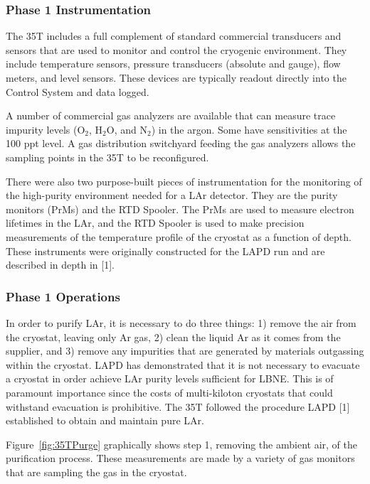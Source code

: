 \subsubsection {Phase 1 Instrumentation}

The 35T includes a full complement of standard commercial transducers and sensors that are used to 
monitor and control the cryogenic environment. They include temperature sensors, pressure transducers 
(absolute and gauge), flow meters, and level sensors. These devices are typically readout directly into the 
Control System and data logged. 

A number of commercial gas analyzers are available that can measure trace impurity levels (O$_2$, H$_2$O, and 
N$_2$) in the argon. Some have sensitivities at the 100 ppt level. A gas distribution switchyard feeding the 
gas analyzers allows the sampling points in the 35T to be reconfigured.

There were also two purpose-built pieces of instrumentation for the monitoring of the high-purity 
environment needed for a LAr detector. They are the purity monitors (PrMs) and the RTD Spooler. The 
PrMs are used to measure electron lifetimes in the LAr, and the RTD Spooler is used to make precision 
measurements of the temperature profile of the cryostat as a function of depth.  These instruments were 
originally constructed for the LAPD run and are described in depth in [1]\fixme{}.

\subsubsection {Phase 1 Operations}

In order to purify LAr, it is necessary to do three things: 1) remove the air from the cryostat, leaving only Ar gas, 2) clean the liquid Ar as it comes from the supplier, and 3) remove any impurities that are generated by materials outgassing within the cryostat.  
LAPD has demonstrated that it is not necessary to evacuate a cryostat in order achieve LAr purity levels sufficient for LBNE. This is of paramount importance since the costs of multi-kiloton cryostats that could withstand evacuation is prohibitive. The 35T followed the procedure LAPD [1] established to obtain and maintain pure LAr. 


Figure~\ref{fig:35TPurge} graphically shows step 1, removing the ambient air, of the purification process. These measurements are made by a variety of gas monitors that are sampling the gas in the cryostat. 

